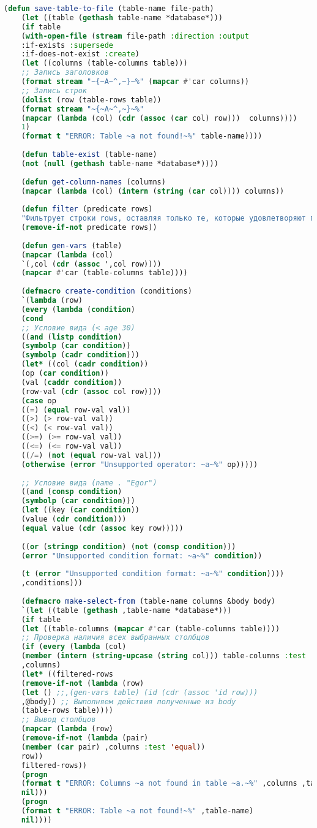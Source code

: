 \begin{lstlisting}[language=Lisp]
	(defun save-table-to-file (table-name file-path)
	(let ((table (gethash table-name *database*)))
	(if table
	(with-open-file (stream file-path :direction :output 
	:if-exists :supersede
	:if-does-not-exist :create)
	(let ((columns (table-columns table)))
	;; Запись заголовков
	(format stream "~{~A~^,~}~%" (mapcar #'car columns))
	;; Запись строк
	(dolist (row (table-rows table))
	(format stream "~{~A~^,~}~%" 
	(mapcar (lambda (col) (cdr (assoc (car col) row)))  columns))))
	1)
	(format t "ERROR: Table ~a not found!~%" table-name))))			 
	
	(defun table-exist (table-name)
	(not (null (gethash table-name *database*))))
	
	(defun get-column-names (columns)
	(mapcar (lambda (col) (intern (string (car col)))) columns))
	
	(defun filter (predicate rows)
	"Фильтрует строки rows, оставляя только те, которые удовлетворяют предикату predicate."
	(remove-if-not predicate rows))
	
	(defun gen-vars (table)
	(mapcar (lambda (col)
	`(,col (cdr (assoc ',col row))))
	(mapcar #'car (table-columns table))))
	
	(defmacro create-condition (conditions)
	`(lambda (row)
	(every (lambda (condition)
	(cond
	;; Условие вида (< age 30)
	((and (listp condition)
	(symbolp (car condition))
	(symbolp (cadr condition)))
	(let* ((col (cadr condition))
	(op (car condition))
	(val (caddr condition))
	(row-val (cdr (assoc col row))))
	(case op
	((=) (equal row-val val))
	((>) (> row-val val))
	((<) (< row-val val))
	((>=) (>= row-val val))
	((<=) (<= row-val val))
	((/=) (not (equal row-val val)))
	(otherwise (error "Unsupported operator: ~a~%" op)))))
	
	;; Условие вида (name . "Egor")
	((and (consp condition)
	(symbolp (car condition)))
	(let ((key (car condition))
	(value (cdr condition)))
	(equal value (cdr (assoc key row)))))
	
	((or (stringp condition) (not (consp condition)))
	(error "Unsupported condition format: ~a~%" condition))
	
	(t (error "Unsupported condition format: ~a~%" condition))))
	,conditions)))
	
	(defmacro make-select-from (table-name columns &body body)
	`(let ((table (gethash ,table-name *database*)))
	(if table
	(let ((table-columns (mapcar #'car (table-columns table))))
	;; Проверка наличия всех выбранных столбцов
	(if (every (lambda (col) 
	(member (intern (string-upcase (string col))) table-columns :test 'eq)) 
	,columns)
	(let* ((filtered-rows
	(remove-if-not (lambda (row) 
	(let () ;;,(gen-vars table) (id (cdr (assoc 'id row)))
	,@body)) ;; Выполняем действия полученные из body
	(table-rows table))))
	;; Вывод столбцов
	(mapcar (lambda (row) 
	(remove-if-not (lambda (pair) 
	(member (car pair) ,columns :test 'equal))
	row))
	filtered-rows))
	(progn
	(format t "ERROR: Columns ~a not found in table ~a.~%" ,columns ,table-name)
	nil)))
	(progn
	(format t "ERROR: Table ~a not found!~%" ,table-name)
	nil))))
	

\end{lstlisting}
